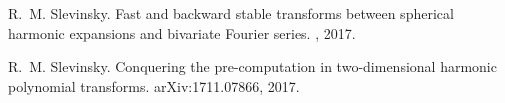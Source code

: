 \documentclass{article}
\begin{document}
\begin{thebibliography}{1}

R.~M. Slevinsky.
\newblock Fast and backward stable transforms between spherical harmonic
  expansions and bivariate {F}ourier series.
, 2017.

R.~M. Slevinsky.
\newblock Conquering the pre-computation in two-dimensional harmonic polynomial
  transforms.
\newblock arXiv:1711.07866, 2017.

\end{thebibliography}
\end{document}
